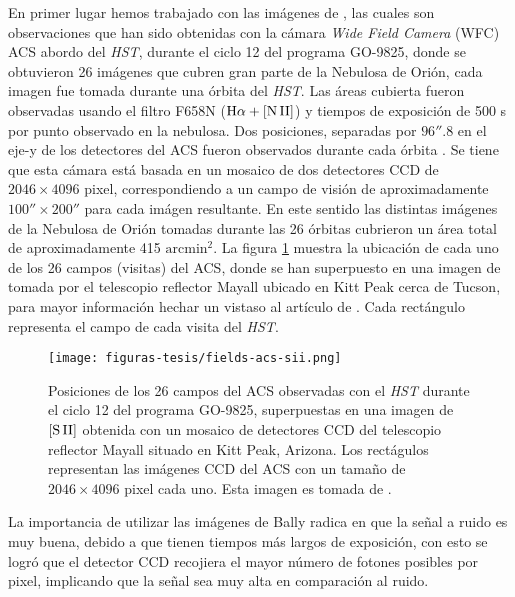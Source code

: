 En primer lugar  hemos trabajado con las imágenes de \citet{Bally:2006a}, las cuales son observaciones que han sido obtenidas con la cámara \textit{Wide Field Camera} (WFC) ACS abordo del \textit{HST}, durante el ciclo 12 del programa GO-9825, donde se obtuvieron 26 imágenes que cubren gran parte de la Nebulosa de Orión, cada imagen fue tomada durante una órbita del \textit{HST}. Las áreas cubierta fueron observadas usando el filtro F658N (\(\mathrm{H}\alpha+\mathrm{[N\,II]}\)) y tiempos de exposición de 500 s por punto observado en la nebulosa. Dos posiciones, separadas por \(96''.8\) en el eje-y de los detectores del ACS fueron observados durante cada órbita \citep{Bally:2006a}. Se tiene que esta cámara está basada en un mosaico de dos detectores CCD de \(2046 \times 4096\) pixel, correspondiendo a un campo de visión de aproximadamente \(100'' \times 200'' \) para cada imágen resultante. En este sentido las distintas imágenes de la Nebulosa de Orión tomadas durante las 26 órbitas cubrieron un área total de aproximadamente 415 \(\text{arcmin}^{2}\). La figura \ref{fig:fields} muestra la ubicación de cada uno de los 26 campos (visitas) del ACS, donde se han superpuesto en una imagen de \sii{} tomada por el telescopio reflector Mayall ubicado en Kitt Peak cerca de Tucson, para mayor información hechar un vistaso al artículo de \citet{Bally:2001a}. Cada rectángulo representa el campo de cada visita del \textit{HST}.\\

\begin{figure}
  \centering
  \texttt{[image: figuras-tesis/fields-acs-sii.png]}
  \caption{Posiciones de los 26 campos del ACS observadas con el \textit{HST} durante el ciclo 12 del programa GO-9825, superpuestas en una imagen de \(\mathrm{[S\,II]}\) obtenida con un mosaico de detectores CCD del telescopio reflector Mayall situado en Kitt Peak, Arizona. Los rectágulos representan las imágenes CCD del ACS con un tamaño de \(2046 \times 4096\) pixel cada uno. Esta imagen es tomada de \citet{Bally:2006a}.}
  \label{fig:fields}
\end{figure}

La importancia de utilizar las imágenes de Bally radica en que la señal a ruido es muy buena, debido a que tienen tiempos más largos de exposición, con esto se logró que el detector CCD recojiera el mayor número de fotones posibles por pixel, implicando que la señal sea muy alta en comparación al ruido.\\

